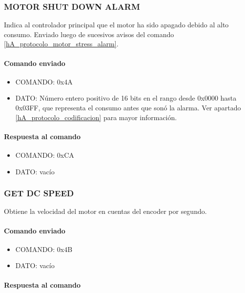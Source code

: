 \subsubsection{MOTOR SHUT DOWN ALARM}
\label{hA_protocolo_motor_shutdown_alarm}

Indica al controlador principal que el motor ha sido apagado debido al alto consumo.
Enviado luego de sucesivos avisos del comando \ref{hA_protocolo_motor_stress_alarm}.

\paragraph*{Comando enviado}

\begin{itemize}
	\item{COMANDO:} 0x4A
	\item{DATO:} N\'umero entero positivo de 16 bits en el rango desde 0x0000 hasta 0x03FF, que representa el consumo antes que son\'o la alarma.
		Ver apartado \ref{hA_protocolo_codificacion} para mayor informaci\'on.
\end{itemize}

\paragraph*{Respuesta al comando}

\begin{itemize}
	\item{COMANDO:} 0xCA
	\item{DATO:} vac\'io
\end{itemize}

\subsubsection{GET DC SPEED}
\label{hA_protocolo_set_dc_speed}

Obtiene la velocidad del motor en cuentas del encoder por segundo.

\paragraph*{Comando enviado}
\begin{itemize}
	\item{COMANDO:} 0x4B
	\item{DATO:} vac\'io
\end{itemize}

\paragraph*{Respuesta al comando}

